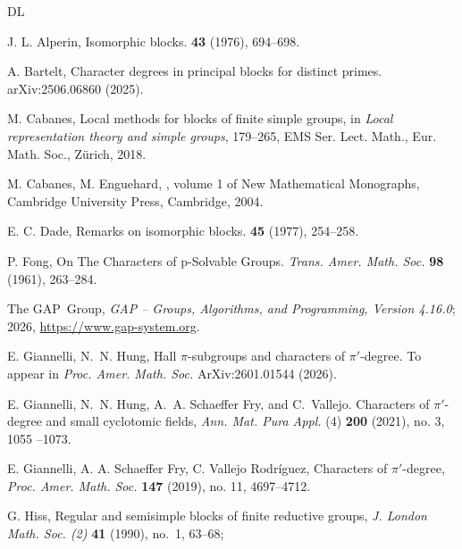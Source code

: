 \documentclass[a4paper,12pt,leqno]{amsart}
\newcommand{\6}{^}
\theoremstyle{definition}
\theoremstyle{definition}
\theoremstyle{definition}
\theoremstyle{definition}
\theoremstyle{definition}
\begin{document}
\begin{thebibliography}{DL}

{\sc J. L. Alperin,}
\newblock Isomorphic blocks.
 \textbf{43} (1976), 694--698.

{\sc A. Bartelt},
Character degrees in principal blocks for distinct primes. 	arXiv:2506.06860 (2025).

{\sc M. Cabanes}, Local methods for blocks of finite simple groups, in {\it Local representation theory and simple groups}, 179--265, EMS Ser. Lect. Math., Eur. Math. Soc., Z\"urich, 2018.

{\sc M. Cabanes, M. Enguehard},
, volume 1 of
\newblock New Mathematical Monographs, 
\newblock Cambridge University Press, Cambridge, 2004.

{\sc E. C. Dade,}
\newblock Remarks on isomorphic blocks.
 \textbf{45} (1977), 254--258.

{\sc P. Fong,} 
On The Characters of p-Solvable Groups. {\em Trans. Amer. Math. Soc.} {\bf 98} (1961), 263--284.

  The GAP~Group, \emph{GAP -- Groups, Algorithms, and Programming, 
  Version 4.16.0}; 
  2026,
  \url{https://www.gap-system.org}.

{\sc  E. Giannelli, N.~N. Hung},
Hall $\pi$-subgroups and characters of $\pi'$-degree. To appear in {\em Proc. Amer. Math. Soc.} ArXiv:2601.01544 (2026). 

{\sc E. Giannelli, N.~N. Hung,  A.~A. {Schaeffer Fry}, and C.~Vallejo.}
Characters of $\pi'$-degree and small cyclotomic fields,
{\em  Ann. Mat. Pura Appl.} (4) {\bf 200} (2021), no. 3, 1055 --1073.

 {\sc E. Giannelli, A. A. Schaeffer Fry, C. Vallejo Rodr\'iguez}, Characters of $\pi'$-degree,
 {\em Proc. Amer. Math. Soc.} {\bf 147} (2019), no. 11, 4697--4712.

{\sc G. Hiss}, Regular and semisimple blocks of finite reductive groups, {\em J. London Math. Soc. (2)} {\bf 41} (1990), no.~1, 63--68; 



\end{thebibliography}
\end{document}

